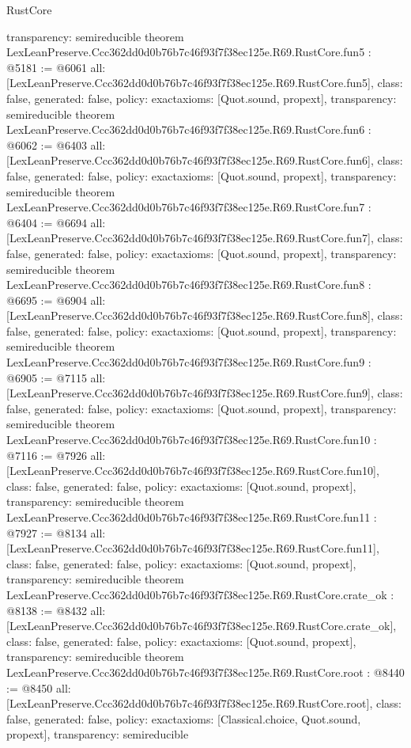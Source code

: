 \begin{lexlean}{RustCore}
\begin{coremodule}
{  transparency: semireducible
}
theorem LexLeanPreserve.Ccc362dd0d0b76b7c46f93f7f38ec125e.R69.RustCore.fun5 : @5181 := @6061 {
  all: [LexLeanPreserve.Ccc362dd0d0b76b7c46f93f7f38ec125e.R69.RustCore.fun5],
  class: false,
  generated: false,
  policy: exact{axioms: [Quot.sound, propext]},
  transparency: semireducible
}
theorem LexLeanPreserve.Ccc362dd0d0b76b7c46f93f7f38ec125e.R69.RustCore.fun6 : @6062 := @6403 {
  all: [LexLeanPreserve.Ccc362dd0d0b76b7c46f93f7f38ec125e.R69.RustCore.fun6],
  class: false,
  generated: false,
  policy: exact{axioms: [Quot.sound, propext]},
  transparency: semireducible
}
theorem LexLeanPreserve.Ccc362dd0d0b76b7c46f93f7f38ec125e.R69.RustCore.fun7 : @6404 := @6694 {
  all: [LexLeanPreserve.Ccc362dd0d0b76b7c46f93f7f38ec125e.R69.RustCore.fun7],
  class: false,
  generated: false,
  policy: exact{axioms: [Quot.sound, propext]},
  transparency: semireducible
}
theorem LexLeanPreserve.Ccc362dd0d0b76b7c46f93f7f38ec125e.R69.RustCore.fun8 : @6695 := @6904 {
  all: [LexLeanPreserve.Ccc362dd0d0b76b7c46f93f7f38ec125e.R69.RustCore.fun8],
  class: false,
  generated: false,
  policy: exact{axioms: [Quot.sound, propext]},
  transparency: semireducible
}
theorem LexLeanPreserve.Ccc362dd0d0b76b7c46f93f7f38ec125e.R69.RustCore.fun9 : @6905 := @7115 {
  all: [LexLeanPreserve.Ccc362dd0d0b76b7c46f93f7f38ec125e.R69.RustCore.fun9],
  class: false,
  generated: false,
  policy: exact{axioms: [Quot.sound, propext]},
  transparency: semireducible
}
theorem LexLeanPreserve.Ccc362dd0d0b76b7c46f93f7f38ec125e.R69.RustCore.fun10 : @7116 := @7926 {
  all: [LexLeanPreserve.Ccc362dd0d0b76b7c46f93f7f38ec125e.R69.RustCore.fun10],
  class: false,
  generated: false,
  policy: exact{axioms: [Quot.sound, propext]},
  transparency: semireducible
}
theorem LexLeanPreserve.Ccc362dd0d0b76b7c46f93f7f38ec125e.R69.RustCore.fun11 : @7927 := @8134 {
  all: [LexLeanPreserve.Ccc362dd0d0b76b7c46f93f7f38ec125e.R69.RustCore.fun11],
  class: false,
  generated: false,
  policy: exact{axioms: [Quot.sound, propext]},
  transparency: semireducible
}
theorem LexLeanPreserve.Ccc362dd0d0b76b7c46f93f7f38ec125e.R69.RustCore.crate_ok : @8138 := @8432 {
  all: [LexLeanPreserve.Ccc362dd0d0b76b7c46f93f7f38ec125e.R69.RustCore.crate_ok],
  class: false,
  generated: false,
  policy: exact{axioms: [Quot.sound, propext]},
  transparency: semireducible
}
theorem LexLeanPreserve.Ccc362dd0d0b76b7c46f93f7f38ec125e.R69.RustCore.root : @8440 := @8450 {
  all: [LexLeanPreserve.Ccc362dd0d0b76b7c46f93f7f38ec125e.R69.RustCore.root],
  class: false,
  generated: false,
  policy: exact{axioms: [Classical.choice, Quot.sound, propext]},
  transparency: semireducible
}


\end{coremodule}
\end{lexlean}
